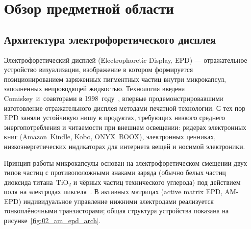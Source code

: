 \chapter{Обзор предметной области}\label{ch:review}

\section{Архитектура электрофоретического дисплея}\label{sec:epd-arch}

Электрофоретический дисплей (Electrophoretic Display, EPD) --- отражательное
устройство визуализации, изображение в котором формируется позиционированием
заряженных пигментных частиц внутри микрокапсул, заполненных непроводящей
жидкостью. Технология введена Comiskey~и~соавторами в 1998~году~\cite{comiskey1998_nature},
впервые продемонстрировавшими изготовление отражательного дисплея методами
печатной технологии. С тех пор EPD заняли устойчивую нишу в продуктах,
требующих низкого среднего энергопотребления и читаемости при внешнем
освещении: ридерах электронных книг (Amazon~Kindle, Kobo, ONYX~BOOX),
электронных ценниках, низкоэнергетических индикаторах для интернета вещей и
носимой электроники.

Принцип работы микрокапсулы основан на электрофоретическом смещении двух типов
частиц с противоположными знаками заряда (обычно белых частиц диоксида
титана~$\mathrm{TiO}_2$ и чёрных частиц технического углерода) под действием
поля на электродах пикселя~\cite{yang2021_mechanisms}. В активных матрицах
(active matrix EPD, AM\nobreakdash-EPD) индивидуальное управление нижними
электродами реализуется тонкоплёночными транзисторами; общая структура
устройства показана на рисунке~\ref{fig:02_am_epd_arch}.

